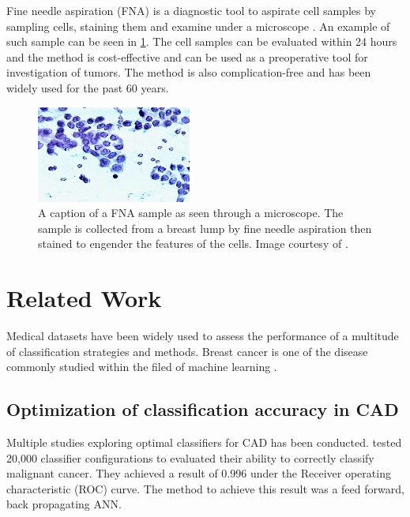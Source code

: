 Fine needle aspiration (FNA) is a diagnostic tool to aspirate cell samples by sampling cells, staining them and examine under a microscope \parencite{FNA}. An example of such sample can be seen in \ref{fig:fna_nuclei}. The cell samples can be evaluated within 24 hours and the method is cost-effective and can be used as a preoperative tool for investigation of tumors. The method is also complication-free and has been widely used for the past 60 years.

\begin{figure}[ht!]
  \centering
  \includegraphics[]{images/fna_nuclei.png}
  \caption[]
  {\small A caption of a FNA sample as seen through a microscope. The sample is collected from a breast lump by fine needle aspiration then stained to engender the features of the cells. Image courtesy of \textcite{dua:2017}.}
  \label{fig:fna_nuclei}
\end{figure}



\section{Related Work}

Medical datasets have been widely used to assess the performance of a multitude of classification strategies and methods. Breast cancer is one of the disease commonly studied within the filed of machine learning \parencite{kononenko2001}.

\subsection{Optimization of classification accuracy in CAD}

Multiple studies exploring optimal classifiers for CAD has been conducted. \textcite{ramos2012} tested 20,000 classifier configurations to evaluated their ability to correctly classify malignant cancer. They achieved a result of 0.996 under the Receiver operating characteristic (ROC) curve. The method to achieve this result was a feed forward, back propagating ANN.

